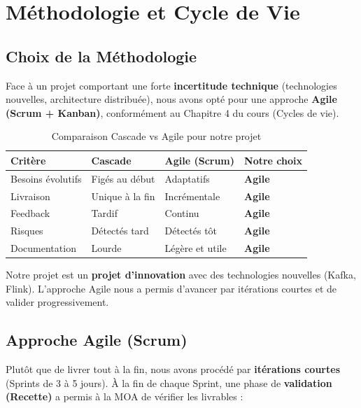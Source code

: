 \chapter{Méthodologie et Cycle de Vie}

\section{Choix de la Méthodologie}

Face à un projet comportant une forte \textbf{incertitude technique} (technologies nouvelles, architecture distribuée), nous avons opté pour une approche \textbf{Agile (Scrum + Kanban)}, conformément au Chapitre 4 du cours (Cycles de vie).

\begin{table}[H]
\centering
\begin{tabularx}{\textwidth}{L{3.5cm} C{3cm} C{3cm} C{3cm}}
\toprule
\textbf{\color{primarycolor}Critère} &
\textbf{\color{primarycolor}Cascade} &
\textbf{\color{primarycolor}Agile (Scrum)} &
\textbf{\color{primarycolor}Notre choix} \\
\midrule
Besoins évolutifs & Figés au début & Adaptatifs & \textbf{Agile} \\
\addlinespace[0.1cm]
Livraison & Unique à la fin & Incrémentale & \textbf{Agile} \\
\addlinespace[0.1cm]
Feedback & Tardif & Continu & \textbf{Agile} \\
\addlinespace[0.1cm]
Risques & Détectés tard & Détectés tôt & \textbf{Agile} \\
\addlinespace[0.1cm]
Documentation & Lourde & Légère et utile & \textbf{Agile} \\
\bottomrule
\end{tabularx}
\caption{Comparaison Cascade vs Agile pour notre projet}
\end{table}

Notre projet est un \textbf{projet d'innovation} avec des technologies nouvelles (Kafka, Flink). L'approche Agile nous a permis d'avancer par itérations courtes et de valider progressivement.

\section{Approche Agile (Scrum)}

Plutôt que de livrer tout à la fin, nous avons procédé par \textbf{itérations courtes} (Sprints de 3 à 5 jours). À la fin de chaque Sprint, une phase de \textbf{validation (Recette)} a permis à la MOA de vérifier les livrables :

